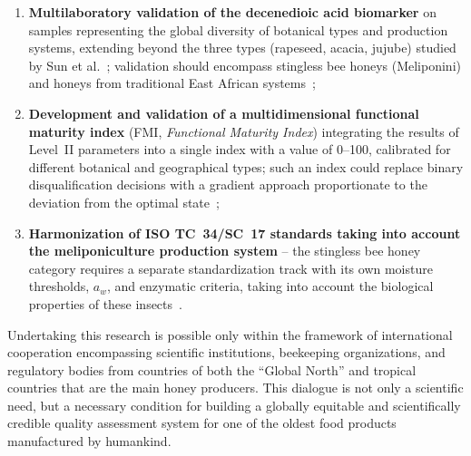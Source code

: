 \begin{enumerate}
    \item \textbf{Multilaboratory validation of the decenedioic
          acid biomarker} on samples representing the global
          diversity of botanical types and production systems,
          extending beyond the three types (rapeseed, acacia,
          jujube) studied by Sun et al.~\cite{sun2021}; validation
          should encompass stingless bee honeys (Meliponini)
          and honeys from traditional East African
          systems~\cite{tadele2025};

    \item \textbf{Development and validation of a multidimensional
          functional maturity index} (FMI,
          \textit{Functional Maturity Index}) integrating the
          results of Level~II parameters into a single index
          with a value of 0--100, calibrated for different
          botanical and geographical types; such an index could
          replace binary disqualification decisions with a
          gradient approach proportionate to the deviation from
          the optimal state~\cite{zhang2021,guo2020,sun2021};

    \item \textbf{Harmonization of ISO TC~34/SC~17 standards
          taking into account the meliponiculture production
          system} -- the stingless bee honey category requires
          a separate standardization track with its own moisture
          thresholds, $a_w$, and enzymatic criteria, taking
          into account the biological properties of these
          insects~\cite{stinglessyeastbrazil2021,stinglesswjava2024}.
\end{enumerate}

Undertaking this research is possible only within the framework
of international cooperation encompassing scientific institutions,
beekeeping organizations, and regulatory bodies from countries of
both the ``Global North'' and tropical countries that are the
main honey producers. This dialogue is not only a scientific need,
but a necessary condition for building a globally equitable and
scientifically credible quality assessment system for one of the
oldest food products manufactured by humankind.

